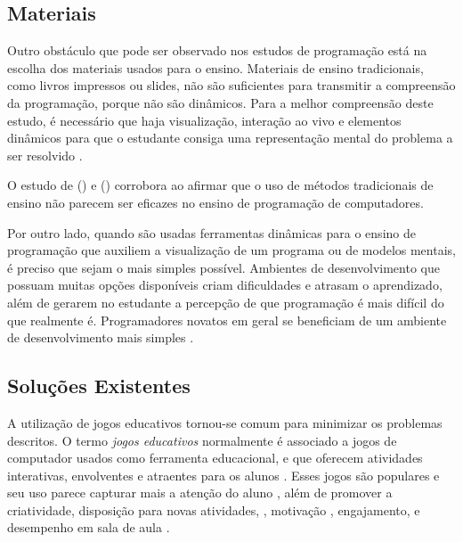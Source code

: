 \subsection{Materiais}

Outro obstáculo que pode ser observado nos estudos de programação está na escolha dos materiais usados para o ensino. Materiais de ensino tradicionais, como livros impressos ou slides, não são suficientes para transmitir a compreensão da programação, porque não são dinâmicos. Para a melhor compreensão deste estudo, é necessário que haja visualização, interação ao vivo e elementos dinâmicos para que o estudante consiga uma representação mental do problema a ser resolvido \cite{gomesmendes2007, cheah2020}.

O estudo de \citeauthor{bennedsencaspersen2005} (\citeyear{bennedsencaspersen2005}) e \citeauthor{zhangetall2013} (\citeyear{zhangetall2013}) corrobora ao afirmar que o uso de métodos tradicionais de ensino não parecem ser eficazes no ensino de programação de computadores.

Por outro lado, quando são usadas ferramentas dinâmicas para o ensino de programação que auxiliem a visualização de um programa ou de modelos mentais, é preciso que sejam o mais simples possível. Ambientes de desenvolvimento que possuam muitas opções disponíveis criam dificuldades e atrasam o aprendizado, além de gerarem no estudante a percepção de que programação é mais difícil do que realmente é. Programadores novatos em geral se beneficiam de um ambiente de desenvolvimento mais simples \cite{MasonCooper2013, robins2019}.

\subsection{Soluções Existentes}


A utilização de jogos educativos tornou-se comum para minimizar os problemas descritos. O termo \emph{jogos educativos} normalmente é associado a jogos de computador usados como ferramenta educacional, e que oferecem atividades interativas, envolventes e atraentes para os alunos \cite{gunterkennyvick2007}.  Esses jogos são populares e seu uso parece capturar mais a atenção do aluno \cite{barnesetall2007}, além de promover a criatividade, disposição para novas atividades, \cite{kellygibson2006}, motivação \cite{freitasjavris2006}, engajamento, e desempenho em sala de aula \cite{chaffinetall2009}.

